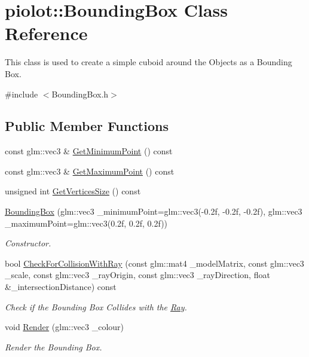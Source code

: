 \hypertarget{classpiolot_1_1_bounding_box}{}\section{piolot\+:\+:Bounding\+Box Class Reference}
\label{classpiolot_1_1_bounding_box}


This class is used to create a simple cuboid around the Objects as a Bounding Box.  




{\ttfamily \#include $<$Bounding\+Box.\+h$>$}

\subsection*{Public Member Functions}
\begin{DoxyCompactItemize}
\item 
const glm\+::vec3 \& \mbox{\hyperlink{group___getters_ga1534921bb22645320614b4cf02268906}{Get\+Minimum\+Point}} () const
\item 
const glm\+::vec3 \& \mbox{\hyperlink{group___getters_gafd9222c8fb47c5484c873ace9d66a37d}{Get\+Maximum\+Point}} () const
\item 
unsigned int \mbox{\hyperlink{group___getters_ga57651f343f21133fc6c89c8c5619ed84}{Get\+Vertices\+Size}} () const
\item 
\mbox{\hyperlink{group___getters_ga699e27e8e646be7a0a47f89abb35778d}{Bounding\+Box}} (glm\+::vec3 \+\_\+minimum\+Point=glm\+::vec3(-\/0.\+2f, -\/0.\+2f, -\/0.\+2f), glm\+::vec3 \+\_\+maximum\+Point=glm\+::vec3(0.\+2f, 0.\+2f, 0.\+2f))
\begin{DoxyCompactList}\small\item\em Constructor. \end{DoxyCompactList}\item 
bool \mbox{\hyperlink{group___getters_ga552fcdb461cdc71c5da0fed7b486246d}{Check\+For\+Collision\+With\+Ray}} (const glm\+::mat4 \+\_\+model\+Matrix, const glm\+::vec3 \+\_\+scale, const glm\+::vec3 \+\_\+ray\+Origin, const glm\+::vec3 \+\_\+ray\+Direction, float \&\+\_\+intersection\+Distance) const
\begin{DoxyCompactList}\small\item\em Check if the Bounding Box Collides with the \mbox{\hyperlink{classpiolot_1_1_ray}{Ray}}. \end{DoxyCompactList}\item 
void \mbox{\hyperlink{group___getters_ga3ef9f966674be7fa0448d388b7a3d776}{Render}} (glm\+::vec3 \+\_\+colour)
\begin{DoxyCompactList}\small\item\em Render the Bounding Box. \end{DoxyCompactList}\end{DoxyCompactItemize}
